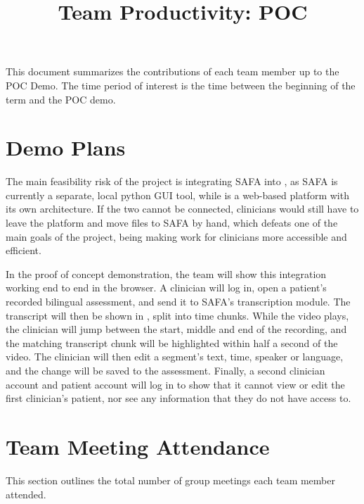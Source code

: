 \documentclass{article}
\title{Team Productivity: POC\\\progname}
\author{\authname}
\date{}
\begin{document}
\maketitle

This document summarizes the contributions of each team member up to the POC
Demo.  The time period of interest is the time between the beginning of the term
and the POC demo.




\section{Demo Plans}

The main feasibility risk of the project is integrating SAFA into \progname{}, as
SAFA is currently a separate, local python GUI tool, while \progname{} is a web-based
platform with its own architecture. If the two cannot be connected, clinicians
would still have to leave the platform and move files to SAFA by hand, which
defeats one of the main goals of the project, being making work for clinicians
more accessible and efficient.

In the proof of concept demonstration, the team will show this integration
working end to end in the browser. A clinician will log in, open a patient's
recorded bilingual assessment, and send it to SAFA's transcription module. The
transcript will then be shown in \progname{}, split into time chunks. While the
video plays, the clinician will jump between the start, middle and end of the
recording, and the matching transcript chunk will be highlighted within half a
second of the video. The clinician will then edit a segment's text, time, speaker
or language, and the change will be saved to the assessment. Finally, a second
clinician account and patient account will log in to show that it cannot view or edit the first
clinician's patient, nor see any information that they do not have access to.

\section{Team Meeting Attendance}
This section outlines the total number of group meetings each team member attended.
\end{document}
